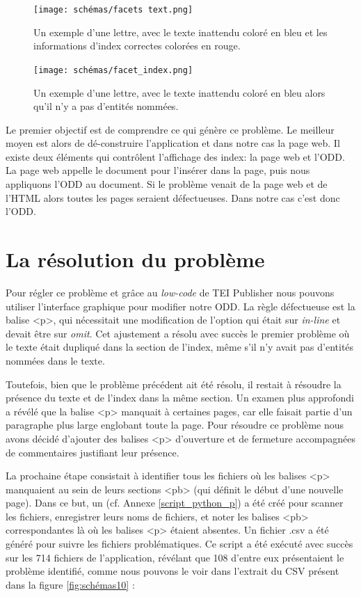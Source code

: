 \begin{figure}[H]
  \centering
  \texttt{[image: schémas/facets text.png]}
  \caption{Un exemple d'une lettre, avec le texte inattendu coloré en bleu et les informations d'index correctes colorées en rouge.}
  \label{fig:schémas04}
\end{figure}

\begin{figure}[H]
  \centering
  \texttt{[image: schémas/facet\_index.png]}
  \caption{Un exemple d'une lettre, avec le texte inattendu coloré en bleu alors qu'il n'y a pas d'entités nommées.}
  \label{fig:schémas05}
\end{figure}

Le premier objectif est de comprendre ce qui génère ce problème. Le meilleur moyen est alors de dé-construire l'application et dans notre cas la page web. Il existe deux éléments qui contrôlent l'affichage des index: la page web et l'ODD. La page web appelle le document pour l'insérer dans la page, puis nous appliquons l'ODD au document. Si le problème venait de la page web et de l'HTML alors toutes les pages seraient défectueuses. Dans notre cas c'est donc l'ODD.  

\section{La résolution du problème}

Pour régler ce problème et grâce au \textit{low-code} de TEI Publisher nous pouvons utiliser l'interface graphique pour modifier notre ODD. La règle défectueuse est la balise <p>, qui nécessitait une modification de l'option qui était sur \textit{in-line} et devait être sur \textit{omit}. Cet ajustement a résolu avec succès le premier problème où le texte était dupliqué dans la section de l'index, même s'il n'y avait pas d'entités nommées dans le texte.

Toutefois, bien que le problème précédent ait été résolu, il restait à résoudre la présence du texte et de l'index dans la même section. Un examen plus approfondi a révélé que la balise <p> manquait à certaines pages, car elle faisait partie d'un paragraphe plus large englobant toute la page. Pour résoudre ce problème nous avons décidé d'ajouter des balises <p> d'ouverture et de fermeture accompagnées de commentaires justifiant leur présence. 

La prochaine étape consistait à identifier tous les fichiers où les balises <p> manquaient au sein de leurs sections <pb> (qui définit le début d'une nouvelle page). Dans ce but, un (cf. Annexe \ref{script_python_p}) a été créé pour scanner les fichiers, enregistrer leurs noms de fichiers, et noter les balises <pb> correspondantes là où les balises <p> étaient absentes. Un fichier .csv a été généré pour suivre les fichiers problématiques. Ce script a été exécuté avec succès sur les 714 fichiers de l'application, révélant que 108 d'entre eux présentaient le problème identifié, comme nous pouvons le voir dans l’extrait du CSV présent dans la figure \ref{fig:schémas10} :

